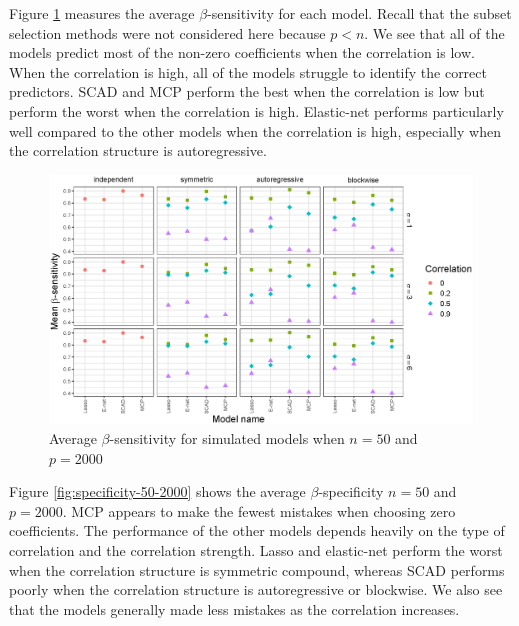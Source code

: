 \documentclass{article}
\begin{document}
Figure \ref{fig:sensitivity-50-2000} measures the average $\beta$-sensitivity for each model. Recall that the subset selection methods were not considered here because $p < n$. We see that all of the models predict most of the non-zero coefficients when the correlation is low. When the correlation is high, all of the models struggle to identify the correct predictors. SCAD and MCP perform the best when the correlation is low but perform the worst when the correlation is high. Elastic-net performs particularly well compared to the other models when the correlation is high, especially when the correlation structure is autoregressive.

\begin{figure}[h!]
	\centering
	\includegraphics[width = \textwidth]{images/facet-sensitivity/facet_sensitivity_50_2000.eps}
	\captionsetup{width = 0.8\textwidth}
	\caption{Average $\beta$-sensitivity for simulated models when $n = 50$ and $p = 2000$}
	\label{fig:sensitivity-50-2000}
\end{figure}

Figure \ref{fig:specificity-50-2000} shows the average $\beta$-specificity $n = 50$ and $p = 2000$. MCP appears to make the fewest mistakes when choosing zero coefficients. The performance of the other models depends heavily on the type of correlation and the correlation strength. Lasso and elastic-net perform the worst when the correlation structure is symmetric compound, whereas SCAD performs poorly when the correlation structure is autoregressive or blockwise. We also see that the models generally made less mistakes as the correlation increases.
\end{document}
